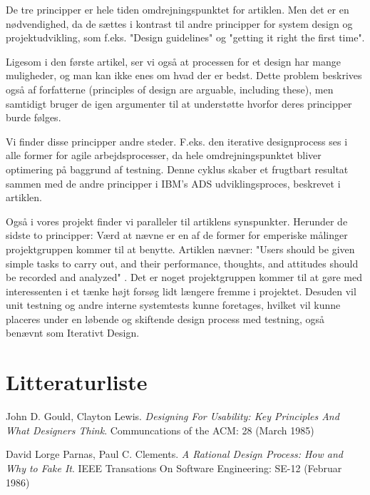 \documentclass[a4paper,12pt]{article}
\begin{document}
De tre principper er hele tiden omdrejningspunktet for artiklen. Men det er en nødvendighed, da de sættes i kontrast til andre principper for system design og projektudvikling, som f.eks. "Design guidelines" og "getting it right the first time". \cite[side~304]{dfu}

Ligesom i den første artikel, ser vi også at processen for et design har mange muligheder, og man kan ikke enes om hvad der er bedst. Dette problem beskrives også af forfatterne (principles of design are arguable, including these)\cite[side~303]{dfu}, men samtidigt bruger de igen argumenter til at understøtte hvorfor deres principper burde følges.

Vi finder disse principper andre steder. F.eks. den iterative designprocess ses i alle former for agile arbejdsprocesser, da hele omdrejningspunktet bliver optimering på baggrund af testning. Denne cyklus skaber et frugtbart resultat sammen med de andre principper i IBM's ADS udviklingsproces, beskrevet i artiklen.\cite[side~309]{dfu}

Også i vores projekt finder vi paralleler til artiklens synspunkter. Herunder de sidste to principper:
Værd at nævne er en af de former for emperiske målinger projektgruppen kommer til at benytte. Artiklen nævner: "Users should be given simple tasks to carry out, and their performance, thoughts, and attitudes should be recorded and analyzed" \cite[side~302]{dfu}. Det er noget projektgruppen kommer til at gøre med interessenten i et tænke højt forsøg lidt længere fremme i projektet.
Desuden vil unit testning og andre interne systemtests kunne foretages, hvilket vil kunne placeres under en løbende og skiftende design process med testning, også benævnt som Iterativt Design.

\newpage
\section{Litteraturliste}

\begin{thebibliography}{9}

	John D. Gould, Clayton Lewis.
	\emph{Designing For Usability: Key Principles And What Designers Think}.
	Communcations of the ACM: 28 (March 1985)
	
	David Lorge Parnas, Paul C. Clements.
	\emph{A Rational Design Process: How and Why to Fake It}.
	IEEE Transations On Software Engineering: SE-12 (Februar 1986)
\end{thebibliography}
\end{document}
